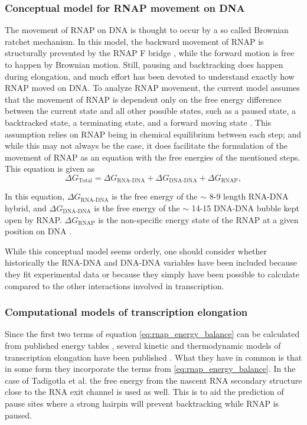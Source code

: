 %

\subsubsection{Conceptual model for RNAP movement on DNA}
The movement of RNAP on DNA is thought to occur by a so called Brownian ratchet
mechanism. In this model, the backward movement of RNAP is structurally
prevented by the RNAP F bridge \cite{bar-nahum_ratchet_2005}, while the forward
motion is free to happen by Brownian motion. Still, pausing and backtracking
does happen during elongation, and much effort has been devoted to understand
exactly how RNAP moved on DNA. To analyze RNAP movement, the current model
assumes that the movement of RNAP is dependent only on the free energy
difference between the current state and all other possible states, such as a
paused state, a backtracked state, a terminating state, and a forward moving
state \cite{greive_thinking_2005}. This assumption relies on RNAP being in
chemical equilibrium between each step; and while this may not always be the case,
it does facilitate the formulation of the movement of RNAP as an equation with
the free energies of the mentioned steps. This equation is given as
\cite{greive_thinking}
\begin{equation}
	\Delta G_{\text{Total}} = \Delta G_{\text{RNA-DNA}} + \Delta
	G_{\text{DNA-DNA}} + \Delta G_{\text{RNAP}},
	\label{eq:rnap_energy_balance}
\end{equation}

In this equation, $\Delta G_{\text{RNA-DNA}}$ is the free energy of the $\sim$
8-9 length RNA-DNA hybrid, and $\Delta G_{\text{DNA-DNA}}$ is the free energy
of the $\sim$ 14-15 DNA-DNA bubble kept open by RNAP. $\Delta G_{\text{RNAP}}$
is the non-specific energy state of the RNAP at a given position on DNA
\cite{greive_thinking_2005}.

While this conceptual model seems orderly, one should consider whether
historically the RNA-DNA and DNA-DNA variables have been included because they
fit experimental data or because they simply have been possible to calculate
compared to the other interactions involved in transcription.

\subsubsection{Computational models of transcription elongation}
Since the first two terms of equation \eqref{eq:rnap_energy_balance} can be
calculated from published energy tables \cite{wu_temperature_2002,
santalucia_thermodynamics_2004}, several kinetic and thermodynamic models of
transcription elongation have been published
\cite{tadigotla_thermodynamic_2006-1, bai_sequence-dependent_2004,
guajardo_model_1997}. What they have in common is that in some form they
incorporate the terms from \eqref{eq:rnap_energy_balance}. In the case of
Tadigotla et al. \cite{tadigotla_thermodynamic_2006-1} the free energy from the
nascent RNA secondary structure close to the RNA exit channel is used as well.
This is to aid the prediction of pause sites where a strong hairpin will
prevent backtracking while RNAP is paused.

